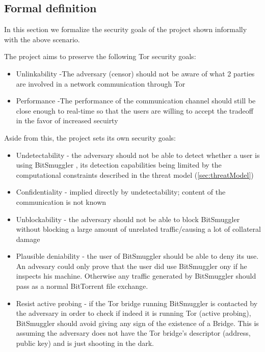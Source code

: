 \documentclass[11pt]{book} %
\newcommand{\projectName}{BitSmuggler }
\begin{document}
\subsection{Formal definition}

In this section we formalize the security goals of the project shown informally with the above scenario.

The project aims to preserve the following Tor security goals:

\begin{itemize}
\item Unlinkability -The adversary (censor) should not be aware of what 2 parties are involved in a network communication through Tor
\item Performance -The performance of the communication channel should still be close enough to real-time so that the users are willing  to accept the tradeoff  in the favor of increased secuirty
\end{itemize}

Aside from this, the project sets its own security goals: 
\begin{itemize}
\item Undetectability - the adversary should not be able to detect whether a user is using \projectName, its detection capabilities being limited by the computational constraints described in the threat model (\ref{sec:threatModel})
\item Confidentiality - implied directly by undetectability; content of the communication is not known
\item Unblockability - the adversary should not be able to block \projectName without blocking a large amount of unrelated traffic/causing a lot of collateral damage
\item Plausible deniability - the user of \projectName should be able to deny its use. An advesary could only prove that the user did use \projectName ony if he inspects his machine. Otherwise any traffic generated by \projectName should pass as a normal BitTorrent file exchange.
\item Resist active probing - if the Tor bridge running \projectName is contacted by the adversary in order to check if indeed it is running Tor (active probing), \projectName should avoid giving any sign of the existence of a Bridge. This is assuming the adversary does not have the Tor bridge's descriptor (address, public key) and is just shooting in the dark.
\end{itemize}
\end{document}
